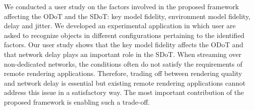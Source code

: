 We conducted a user study on the factors involved in the proposed framework affecting the ODoT and the SDoT: key model fidelity, environment model fidelity, delay and jitter. We developed an experimental application in which user are asked to recognize objects in different configurations pertaining to the identified factors. Our user study shows that the key model fidelity affects the ODoT and that network delay plays an important role in the SDoT. When streaming over non-dedicated networks, the conditions often do not satisfy the requirements of remote rendering applications. Therefore, trading off between rendering quality and network delay is essential but existing remote rendering applications cannot address this issue in a satisfactory way. The most important contribution of the proposed framework is enabling such a trade-off.
